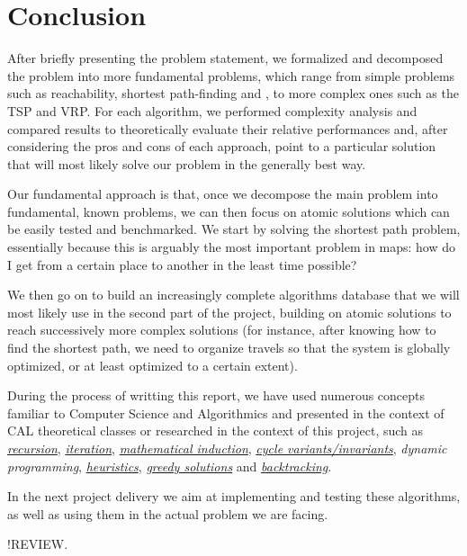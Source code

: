 \chapter{Conclusion} \label{conclusion}
After briefly presenting the problem statement, we formalized and decomposed the problem into more fundamental problems, which range from simple problems such as reachability, shortest path-finding and , to more complex ones such as the \acrshort{TSP} and \acrshort{VRP}. For each algorithm, we performed complexity analysis and compared results to theoretically evaluate their relative performances and, after considering the pros and cons of each approach, point to a particular solution that will most likely solve our problem in the generally best way.\par
Our fundamental approach is that, once we decompose the main problem into fundamental, known problems, we can then focus on atomic solutions which can be easily tested and benchmarked. We start by solving the shortest path problem, essentially because this is arguably the most important problem in maps: how do I get from a certain place to another in the least time possible?\par
We then go on to build an increasingly complete algorithms database that we will most likely use in the second part of the project, building on atomic solutions to reach successively more complex solutions (for instance, after knowing how to find the shortest path, we need to organize travels so that the system is globally optimized, or at least optimized to a certain extent).\par
During the process of writting this report, we have used numerous concepts familiar to Computer Science and Algorithmics and presented in the context of CAL theoretical classes or researched in the context of this project, such as \emph{\hyperref[glsentry-recursive]{recursion}}, \emph{\hyperref[glsentry-iterative]{iteration}}, \emph{\hyperref[teor:dfs]{mathematical induction}}, \emph{\hyperref[sec:dijkstra-PoC]{cycle variants/invariants}}, \emph{\gls{dynamic programming}}, \emph{\hyperref[glsentry-heuristic]{heuristics}}, \emph{\hyperref[glsentry-greedy]{greedy solutions}} and \emph{\hyperref[algorithm-reachability-dfs]{backtracking}}.\par
In the next project delivery we aim at implementing and testing these algorithms, as well as using them in the actual problem we are facing.\par
!REVIEW.
